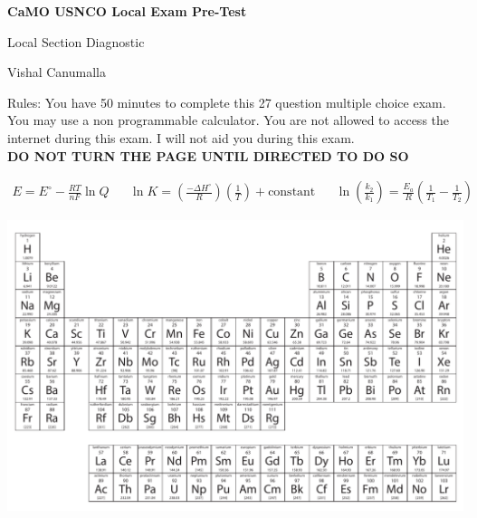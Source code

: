 \documentclass[11pt, leqno]{article}
\begin{document}
\begin{center} \LARGE \textbf{CaMO USNCO Local Exam Pre-Test} \end{center}
\begin{center}
    Local Section Diagnostic
\end{center}
\begin{center} Vishal Canumalla \end{center}


 \noindent Rules: You have 50 minutes to complete this 27 question multiple choice exam. You may use a non programmable calculator. You are not allowed to access the internet during this exam. I will not aid you during this exam. \\
 
 \centering\textbf{DO NOT TURN THE PAGE UNTIL DIRECTED TO DO SO}

\begin{center}

    \begin{align*}
        E = E^{\circ} - \frac{RT}{nF}\ln{Q} && \ln{K} = \left(\frac{-\Delta{H^{\circ}}}{R}\right)\left(\frac{1}{T}\right) + \text{constant} && \ln \left({\frac{k_2}{k_1}}\right) = \frac{E_a}{R}\left(\frac{1}{T_1} - \frac{1}{T_2}\right)
    \end{align*}


\end{center}
\hspace{-0.69 in}\includegraphics[scale = .8]{images/pertable.pdf}
\end{document}
